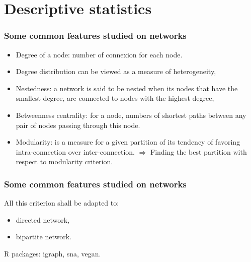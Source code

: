 \documentclass[compress,10pt]{beamer}
\begin{document}
\section{Descriptive statistics}


\begin{frame}
\frametitle{Some common features studied on networks}


\begin{itemize}

\item Degree of a node: number of connexion for each node. 
\item Degree distribution can be viewed as a measure of heterogeneity,
\item Nestedness: a network is said to be nested when its nodes that have the smallest degree, are connected to nodes with the highest degree,
\textcolor{mygreen}{\cite{Rodriguez2006}}

\item Betweenness centrality: for a node, numbers of shortest paths between any pair of nodes passing through this node.
\textcolor{mygreen}{\cite{FREEMAN1978215}}

\item Modularity: is a measure for a given partition of its tendency of favoring intra-connection over inter-connection.  
$\Rightarrow$ Finding the best partition with respect to modularity criterion. 
\textcolor{mygreen}{\cite{clauset2008hierarchical}}
\end{itemize}
\end{frame}


\begin{frame}
\frametitle{Some common features studied on networks}

All this criterion shall be adapted to:
\begin{itemize}
 \item directed network,
 \item bipartite network.
\end{itemize}

\bigskip

\textcolor{mygreen}{R packages: igraph, sna, vegan.} 


\end{frame}
\end{document}
